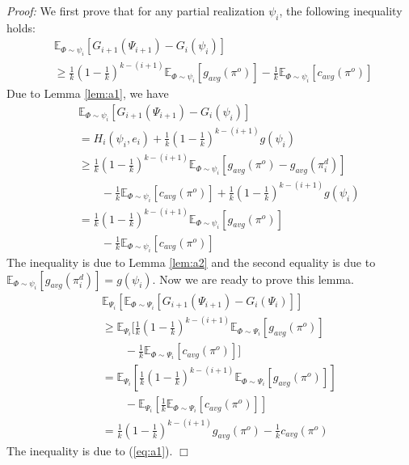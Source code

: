 \documentclass[twoside,leqno,twocolumn]{article}
\begin{document}
\emph{Proof:} We first prove that for any partial realization $\psi_i$, the following inequality holds:
\begin{eqnarray}
&\mathbb{E}_{\Phi\sim \psi_i}[G_{i+1}(\Psi_{i+1})- G_{i}(\psi_i)]\label{eq:a1}\\
&\geq \frac{1}{k}(1-\frac{1}{k})^{k-(i+1)} \mathbb{E}_{\Phi\sim \psi_i}[g_{avg}(\pi^o)]-\frac{1}{k}\mathbb{E}_{\Phi\sim \psi_i}[c_{avg}(\pi^o)]~\nonumber
\end{eqnarray}
Due to Lemma \ref{lem:a1}, we have
\begin{eqnarray*}
&&\mathbb{E}_{\Phi\sim \psi_i}[G_{i+1}(\Psi_{i+1})- G_{i}(\psi_i)] \\
&&= H_i(\psi_i, e_i)+\frac{1}{k}(1-\frac{1}{k})^{k-(i+1)} g(\psi_i)\\
&& \geq \frac{1}{k}(1-\frac{1}{k})^{k-(i+1)} \mathbb{E}_{\Phi\sim \psi_i}[g_{avg}(\pi^o)-g_{avg}(\pi^d_i)]\\
&&\quad\quad-\frac{1}{k}\mathbb{E}_{\Phi\sim \psi_i}[c_{avg}(\pi^o)] + \frac{1}{k}(1-\frac{1}{k})^{k-(i+1)} g(\psi_i)\\
&& = \frac{1}{k}(1-\frac{1}{k})^{k-(i+1)} \mathbb{E}_{\Phi\sim \psi_i}[g_{avg}(\pi^o)]\\
&&\quad\quad-\frac{1}{k}\mathbb{E}_{\Phi\sim \psi_i}[c_{avg}(\pi^o)]
\end{eqnarray*}
The inequality is due to Lemma \ref{lem:a2} and the second equality is due to $\mathbb{E}_{\Phi\sim \psi_i}[g_{avg}(\pi^d_i)] =  g(\psi_i)$. Now we are ready to prove this lemma.
\begin{eqnarray*}
&&\mathbb{E}_{\Psi_i}[\mathbb{E}_{\Phi\sim \Psi_i}[G_{i+1}(\Psi_{i+1})- G_{i}(\Psi_i)]] \\
&& \geq \mathbb{E}_{\Psi_i}[\frac{1}{k}(1-\frac{1}{k})^{k-(i+1)} \mathbb{E}_{\Phi\sim \Psi_i}[g_{avg}(\pi^o)]\\
&&\quad\quad-\frac{1}{k}\mathbb{E}_{\Phi\sim \Psi_i}[c_{avg}(\pi^o)]]\\
&& = \mathbb{E}_{\Psi_i}[\frac{1}{k}(1-\frac{1}{k})^{k-(i+1)} \mathbb{E}_{\Phi\sim \Psi_i}[g_{avg}(\pi^o)]]\\
&& \quad\quad-  \mathbb{E}_{\Psi_i}[\frac{1}{k}\mathbb{E}_{\Phi\sim \Psi_i}[c_{avg}(\pi^o)]]\\
&& = \frac{1}{k}(1-\frac{1}{k})^{k-(i+1)}g_{avg}(\pi^o) -\frac{1}{k}c_{avg}(\pi^o)
\end{eqnarray*}
The  inequality is due to (\ref{eq:a1}). $\Box$
\end{document}
